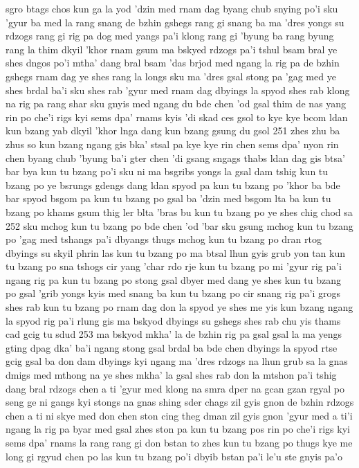 sgro btags chos kun ga la yod
'dzin med rnam dag byang chub snying po'i sku
'gyur ba med la rang snang de bzhin gshegs
rang gi snang ba ma 'dres yongs su rdzogs
rang gi rig pa dog med yangs pa'i klong
rang gi 'byung ba rang byung rang la thim
dkyil 'khor rnam gsum ma bskyed rdzogs pa'i tshul
bsam bral ye shes dngos po'i mtha' dang bral
bsam 'das brjod med ngang la rig pa de bzhin gshegs
rnam dag ye shes rang la longs sku ma 'dres gsal
stong pa 'gag med ye shes brdal ba'i sku
shes rab 'gyur med rnam dag dbyings la spyod
shes rab klong na rig pa rang shar sku
gnyis med ngang du bde chen 'od gsal thim
de nas yang rin po che'i rigs kyi sems dpa' rnams kyis 'di skad ces gsol to
kye kye bcom ldan kun bzang yab
dkyil 'khor lnga dang kun bzang gsung du gsol
251
zhes zhu ba zhus so
kun bzang ngang gis bka' stsal pa
kye kye rin chen sems dpa' nyon
rin chen byang chub 'byung ba'i gter chen 'di
gsang sngags thabs ldan dag gis btsa' bar bya
kun tu bzang po'i sku ni ma bsgribs yongs la gsal
dam tshig kun tu bzang po ye bsrungs gdengs dang ldan
spyod pa kun tu bzang po 'khor ba bde bar spyod
bsgom pa kun tu bzang po gsal ba 'dzin med bsgom
lta ba kun tu bzang po khams gsum thig ler blta
'bras bu kun tu bzang po ye shes chig chod sa
252
sku mchog kun tu bzang po bde chen 'od 'bar sku
gsung mchog kun tu bzang po 'gag med tshangs pa'i dbyangs
thugs mchog kun tu bzang po dran rtog dbyings su skyil
phrin las kun tu bzang po ma btsal lhun gyis grub
yon tan kun tu bzang po sna tshogs cir yang 'char
rdo rje kun tu bzang po mi 'gyur rig pa'i ngang
rig pa kun tu bzang po stong gsal dbyer med dang
ye shes kun tu bzang po gsal 'grib yongs kyis med
snang ba kun tu bzang po cir snang rig pa'i grogs
shes rab kun tu bzang po rnam dag don la spyod
ye shes me yis kun bzang ngang la spyod
rig pa'i rlung gis ma bskyod dbyings su gshegs
shes rab chu yis thams cad gcig tu sdud
253
ma bskyod mkha' la de bzhin rig pa gsal
gsal la ma yengs gting dpag dka' ba'i ngang
stong gsal brdal ba bde chen dbyings la spyod
rtse gcig gsal ba don dam dbyings kyi ngang
ma 'dres rdzogs na lhun grub sa la gnas
dmigs med mthong na ye shes mkha' la gsal
shes rab don la mtshon pa'i tshig dang bral
rdzogs chen a ti 'gyur med klong na smra
dper na gcan gzan rgyal po seng ge ni
gangs kyi stongs na gnas shing sder chags zil gyis gnon
de bzhin rdzogs chen a ti ni
skye med don chen ston cing theg dman zil gyis gnon
'gyur med a ti'i ngang la rig pa byar med gsal
zhes ston pa kun tu bzang pos rin po che'i rigs kyi sems dpa' rnams la rang rang gi don bstan to
zhes kun tu bzang po thugs kye me long gi rgyud chen po las
kun tu bzang po'i dbyib bstan pa'i le'u ste gnyis pa'o
